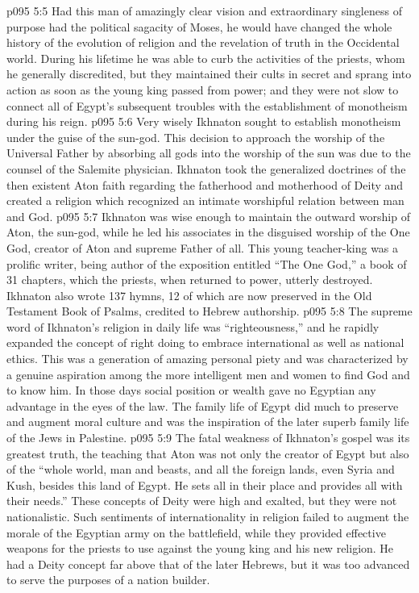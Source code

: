 \vs p095 5:5 Had this man of amazingly clear vision and extraordinary singleness of purpose had the political sagacity of Moses, he would have changed the whole history of the evolution of religion and the revelation of truth in the Occidental world. During his lifetime he was able to curb the activities of the priests, whom he generally discredited, but they maintained their cults in secret and sprang into action as soon as the young king passed from power; and they were not slow to connect all of Egypt’s subsequent troubles with the establishment of monotheism during his reign.
\vs p095 5:6 Very wisely Ikhnaton sought to establish monotheism under the guise of the sun\hyp{}god. This decision to approach the worship of the Universal Father by absorbing all gods into the worship of the sun was due to the counsel of the Salemite physician. Ikhnaton took the generalized doctrines of the then existent Aton faith regarding the fatherhood and motherhood of Deity and created a religion which recognized an intimate worshipful relation between man and God.
\vs p095 5:7 Ikhnaton was wise enough to maintain the outward worship of Aton, the sun\hyp{}god, while he led his associates in the disguised worship of the One God, creator of Aton and supreme Father of all. This young teacher\hyp{}king was a prolific writer, being author of the exposition entitled “The One God,” a book of 31 chapters, which the priests, when returned to power, utterly destroyed. Ikhnaton also wrote 137 hymns, 12 of which are now preserved in the Old Testament Book of Psalms, credited to Hebrew authorship.
\vs p095 5:8 \pc The supreme word of Ikhnaton’s religion in daily life was “righteousness,” and he rapidly expanded the concept of right doing to embrace international as well as national ethics. This was a generation of amazing personal piety and was characterized by a genuine aspiration among the more intelligent men and women to find God and to know him. In those days social position or wealth gave no Egyptian any advantage in the eyes of the law. The family life of Egypt did much to preserve and augment moral culture and was the inspiration of the later superb family life of the Jews in Palestine.
\vs p095 5:9 The fatal weakness of Ikhnaton’s gospel was its greatest truth, the teaching that Aton was not only the creator of Egypt but also of the “whole world, man and beasts, and all the foreign lands, even Syria and Kush, besides this land of Egypt. He sets all in their place and provides all with their needs.” These concepts of Deity were high and exalted, but they were not nationalistic. Such sentiments of internationality in religion failed to augment the morale of the Egyptian army on the battlefield, while they provided effective weapons for the priests to use against the young king and his new religion. He had a Deity concept far above that of the later Hebrews, but it was too advanced to serve the purposes of a nation builder.
